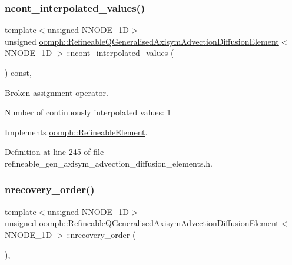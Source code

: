 \subsubsection{\texorpdfstring{ncont\+\_\+interpolated\+\_\+values()}{ncont\_interpolated\_values()}}
{\footnotesize\ttfamily template$<$unsigned N\+N\+O\+D\+E\+\_\+1D$>$ \\
unsigned \hyperlink{classoomph_1_1RefineableQGeneralisedAxisymAdvectionDiffusionElement}{oomph\+::\+Refineable\+Q\+Generalised\+Axisym\+Advection\+Diffusion\+Element}$<$ N\+N\+O\+D\+E\+\_\+1D $>$\+::ncont\+\_\+interpolated\+\_\+values (\begin{DoxyParamCaption}{ }\end{DoxyParamCaption}) const\hspace{0.3cm}{\ttfamily [inline]}, {\ttfamily [virtual]}}



Broken assignment operator. 

Number of continuously interpolated values\+: 1 

Implements \hyperlink{classoomph_1_1RefineableElement_a53e171a18c9f43f1db90a6876516a073}{oomph\+::\+Refineable\+Element}.



Definition at line 245 of file refineable\+\_\+gen\+\_\+axisym\+\_\+advection\+\_\+diffusion\+\_\+elements.\+h.

\mbox{\label{classoomph_1_1RefineableQGeneralisedAxisymAdvectionDiffusionElement_aea11dc4099c09941839a240a9ca1bff7}} 
\subsubsection{\texorpdfstring{nrecovery\+\_\+order()}{nrecovery\_order()}}
{\footnotesize\ttfamily template$<$unsigned N\+N\+O\+D\+E\+\_\+1D$>$ \\
unsigned \hyperlink{classoomph_1_1RefineableQGeneralisedAxisymAdvectionDiffusionElement}{oomph\+::\+Refineable\+Q\+Generalised\+Axisym\+Advection\+Diffusion\+Element}$<$ N\+N\+O\+D\+E\+\_\+1D $>$\+::nrecovery\+\_\+order (\begin{DoxyParamCaption}{ }\end{DoxyParamCaption})\hspace{0.3cm}{\ttfamily [inline]}, {\ttfamily [virtual]}}



